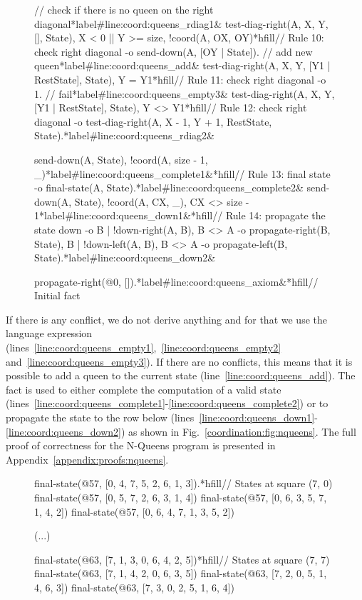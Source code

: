 \begin{figure}[h!]
\begin{LineCode}[fontsize=\scriptsize,commandchars=\*\#\&]
// check if there is no queen on the right diagonal*label#line:coord:queens_rdiag1&
test-diag-right(A, X, Y, [], State), X < 0 || Y >= size, !coord(A, OX, OY)*hfill// Rule 10: check right diagonal
  -o send-down(A, [OY | State]). // add new queen*label#line:coord:queens_add&
test-diag-right(A, X, Y, [Y1 | RestState], State), Y = Y1*hfill// Rule 11: check right diagonal
  -o 1. // fail*label#line:coord:queens_empty3&
test-diag-right(A, X, Y, [Y1 | RestState], State), Y <> Y1*hfill// Rule 12: check right diagonal
  -o test-diag-right(A, X - 1, Y + 1, RestState, State).*label#line:coord:queens_rdiag2&

send-down(A, State), !coord(A, size - 1, _)*label#line:coord:queens_complete1&*hfill// Rule 13: final state
  -o final-state(A, State).*label#line:coord:queens_complete2&
send-down(A, State), !coord(A, CX, _), CX <> size - 1*label#line:coord:queens_down1&*hfill// Rule 14: propagate the state down
  -o {B | !down-right(A, B), B <> A -o propagate-right(B, State)},
     {B | !down-left(A, B), B <> A -o propagate-left(B, State)}.*label#line:coord:queens_down2&

propagate-right(@0, []).*label#line:coord:queens_axiom&*hfill// Initial fact
\end{LineCode}
  \label{code:coordination:nqueens}
\end{figure}

If there is any conflict, we do not derive anything and for that we use the
language expression 
(lines~\ref{line:coord:queens_empty1},~\ref{line:coord:queens_empty2}
and~\ref{line:coord:queens_empty3}). If there are no conflicts, this means that
it is possible to add a queen to the current state
(line~\ref{line:coord:queens_add}). The fact  is used to either
complete the computation of a valid state
(lines~\ref{line:coord:queens_complete1}-\ref{line:coord:queens_complete2}) or
to propagate the state to the row below
(lines~\ref{line:coord:queens_down1}-\ref{line:coord:queens_down2}) as shown in
Fig.~\ref{coordination:fig:nqueens}.
The full proof of correctness for
the N-Queens program is presented in Appendix~\ref{appendix:proofs:nqueens}.


\begin{figure}[h!]
\begin{LineCode}[commandchars=\*\#\&]
final-state(@57, [0, 4, 7, 5, 2, 6, 1, 3]).*hfill// States at square (7, 0)
final-state(@57, [0, 5, 7, 2, 6, 3, 1, 4])
final-state(@57, [0, 6, 3, 5, 7, 1, 4, 2])
final-state(@57, [0, 6, 4, 7, 1, 3, 5, 2])

(...)

final-state(@63, [7, 1, 3, 0, 6, 4, 2, 5])*hfill// States at square (7, 7)
final-state(@63, [7, 1, 4, 2, 0, 6, 3, 5])
final-state(@63, [7, 2, 0, 5, 1, 4, 6, 3])
final-state(@63, [7, 3, 0, 2, 5, 1, 6, 4])
\end{LineCode}
  \label{code:coordination:8queens}
\end{figure}

